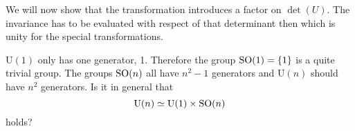 \documentclass[11pt, english, fleqn, DIV=15, headinclude]{scrartcl}
\begin{document}
We will now show that the transformation introduces a factor on $\det(U)$. The
invariance has to be evaluated with respect of that determinant then which is
unity for the special transformations.

\begin{table}
    \begin{question}
        $\mathrm U(1)$ only has one generator, 1. Therefore the group $\mathrm{SO}(1) =
        \{ 1 \}$ is a quite trivial group. The groups $\mathrm{SO}(n)$ all have $n^2-1$
        generators and $\mathrm U(n)$ should have $n^2$ generators. Is it in
        general that
        \[
            \mathrm U(n) \simeq \mathrm U(1) \times \mathrm{SO}(n)
        \]
        holds?
    \end{question}
\end{table}
\end{document}
